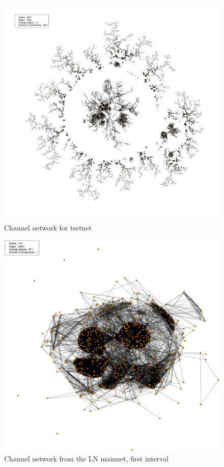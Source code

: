 \begin{figure}[ht]
    \centering
    \includegraphics[width=14cm]{figures/graphs/cg_bc_testnet_full.png}
    \caption{Channel network for testnet}
    \label{fig:cg_testnet_full}
\end{figure}

\begin{figure}[ht]
    \centering
    \includegraphics[width=14cm]{figures/graphs/cg_ln_mainnet_run1.png}
    \caption{Channel network from the LN mainnet, first interval}
    \label{fig:channel_network_LN_mainent}
\end{figure}

